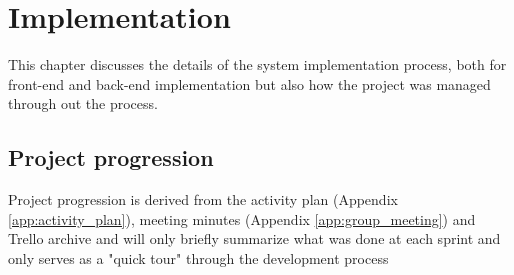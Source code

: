 
\chapter{Implementation}

This chapter discusses the details of the system implementation process, both for front-end and back-end implementation but also how the project was managed through out the process.


\section{Project progression}
Project progression is derived from the activity plan (Appendix \ref{app:activity_plan}), meeting minutes (Appendix \ref{app:group_meeting}) and Trello archive and will only briefly summarize what was done at each sprint and only serves as a "quick tour" through the development process 

